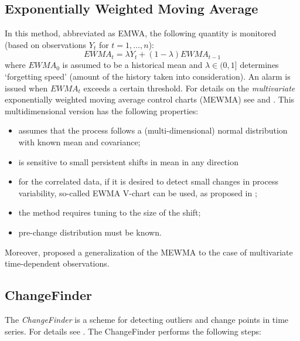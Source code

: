 \documentclass[conference,letterpaper]{IEEEtran}
\begin{document}
\subsection{Exponentially Weighted Moving Average}\label{EWMA}
In this method, abbreviated as EMWA, the following quantity is monitored (based on observations $Y_t$ for $t=1,\ldots,n$): 
\[EWMA_t = \lambda Y_t +(1-\lambda) EWMA_{t-1}\]
where $EWMA_0$ is assumed to be a historical mean and $\lambda \in (0,1]$
determines `forgetting speed' (amount of the history taken into consideration). An alarm is issued when $EWMA_t$ exceeds a certain threshold.
For details on the \textit{multivariate} exponentially weighted moving average control charts (MEWMA) see \cite{LOWRY} and \cite{PRAB}. This multidimensional 
version has the following properties:
\begin{itemize}
\item assumes that the process follows a (multi-dimensional) normal distribution with known mean and covariance;
\item	is sensitive to small persistent shifts in mean in any direction
\item	for the correlated data, if it is desired to detect small changes in process variability, so-called EWMA V-chart can be used, as proposed in \cite{YEH};
\item	the method requires tuning to the size of the shift;
\item  pre-change distribution must be known.
\end{itemize}
Moreover, \cite{KRSC} proposed a generalization of the MEWMA to the case of multivariate time-dependent observations.

\subsection{ChangeFinder} \label{ChangeFinder}
The \emph{ChangeFinder} is a scheme for detecting outliers and change points  in time series. For details see \cite{TAYA}. The ChangeFinder performs the following steps:
\end{document}
